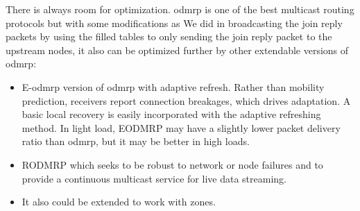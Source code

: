 There is always room for optimization. \acrshort{odmrp} is one of the best multicast routing protocols but with some modifications as We did in broadcasting the join reply packets by using the filled tables to only sending the join reply packet to the upstream nodes, it also can be optimized further by other extendable versions of \acrshort{odmrp}:
\begin{itemize}[itemsep=1pt, topsep=5pt]
    \item E-\acrshort{odmrp} version of \acrshort{odmrp} with adaptive refresh. Rather than mobility prediction, receivers report connection breakages, which drives adaptation. A basic local recovery is easily incorporated with the adaptive refreshing method. In light load, EODMRP \cite{EODMRP} may have a slightly lower packet delivery ratio than \acrshort{odmrp}, but it may be better in high loads.
    \item RODMRP \cite{RODMRP} which seeks to be robust to network or node failures and to provide a continuous multicast service for live data streaming.
    \item It also could be extended to work with zones.
\end{itemize}









